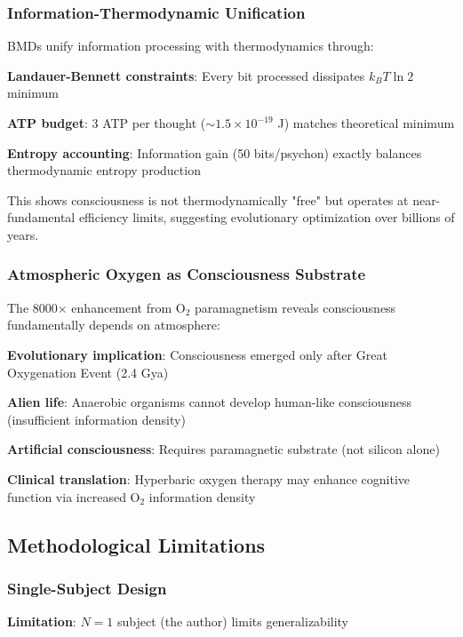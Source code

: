 \documentclass[11pt,onecolumn]{article}
\begin{document}
\subsubsection{Information-Thermodynamic Unification}

BMDs unify information processing with thermodynamics through:

\textbf{Landauer-Bennett constraints}: Every bit processed dissipates $k_B T \ln 2$ minimum

\textbf{ATP budget}: 3 ATP per thought ($\sim 1.5 \times 10^{-19}$ J) matches theoretical minimum

\textbf{Entropy accounting}: Information gain (50 bits/psychon) exactly balances thermodynamic entropy production

This shows consciousness is not thermodynamically "free" but operates at near-fundamental efficiency limits, suggesting evolutionary optimization over billions of years.

\subsubsection{Atmospheric Oxygen as Consciousness Substrate}

The 8000$\times$ enhancement from O$_2$ paramagnetism reveals consciousness fundamentally depends on atmosphere:

\textbf{Evolutionary implication}: Consciousness emerged only after Great Oxygenation Event (2.4 Gya)

\textbf{Alien life}: Anaerobic organisms cannot develop human-like consciousness (insufficient information density)

\textbf{Artificial consciousness}: Requires paramagnetic substrate (not silicon alone)

\textbf{Clinical translation}: Hyperbaric oxygen therapy may enhance cognitive function via increased O$_2$ information density

\subsection{Methodological Limitations}

\subsubsection{Single-Subject Design}

\textbf{Limitation}: $N = 1$ subject (the author) limits generalizability
\end{document}
